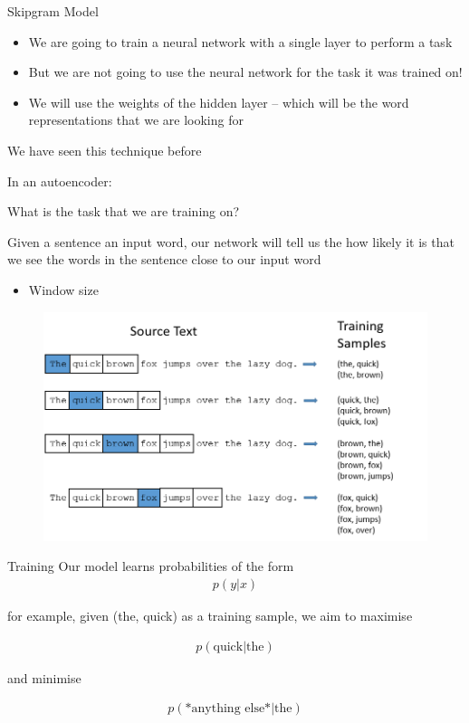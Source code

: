 \documentclass{beamer}
\begin{document}
	\begin{frame}[allowframebreaks]{Skipgram Model}
		\begin{itemize}
			\item We are going to train a neural network with a single layer to perform a task
			\item But we are not going to use the neural network for the task it was trained on!
			\item We will use the weights of the hidden layer -- which will be the word representations that we are looking for
		\end{itemize}
		
		\pagebreak
		
		We have seen this technique before
		
		In an autoencoder:
		
		
		\pagebreak
		
		What is the task that we are training on?
		
		Given a sentence an input word, our network will tell us the how likely it is that we see the words in the sentence close to our input word
		
		\begin{itemize}
			\item Window size
		\end{itemize}
		
		\begin{figure}
			\centering
			\includegraphics[width=\textwidth]{presentation_5_figures/training_data}
		\end{figure}
		
	\end{frame}
	
	\begin{frame}{Training}
		Our model learns probabilities of the form
		\begin{align*}
		p(y | x)
		\end{align*}
		
		for example, given (the, quick) as a training sample, we aim to maximise
		
		\begin{align*}
		p(\text{quick} | \text{the})
		\end{align*}
		
		and minimise
		
		\begin{align*}
		p(\text{*anything else*} | \text{the})
		\end{align*}
	\end{frame}
	
\end{document}
